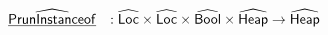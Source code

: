 \documentclass{article}
\newcommand{\ifc}[1]{{\rm if}\begin{array}[t]{l}#1\end{array}}
\newcommand{\SF}[1]{\mbox{\textsf{#1}}}
\newcommand{\wherec}[1]{{\rm where}\begin{array}[t]{l}#1\end{array}}
\newcommand{\owc}{{\rm otherwise}}
\newcommand{\abs}[1]{\widehat{\SF{#1}}}
\newcommand{\aHeap}{\abs{Heap}}
\newcommand{\aLoc}{\abs{Loc}}
\newcommand{\ahf}[1]{\widehat{\underline{\sf #1}}}
\newcommand{\afalse}{\hat{\SF{false}}}
\begin{document}
\[
\begin{array}{ll}
\\\\
\ahf {PrunInstanceof} &:  \aLoc \times \aLoc \times \abs{Bool} \times \aHeap \rightarrow \aHeap\\

\end{array}\]
\end{document}
